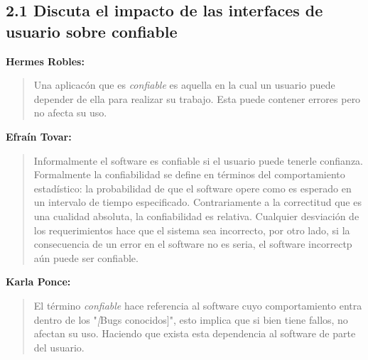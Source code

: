 \subsection*{2.1 Discuta el impacto de las interfaces de usuario sobre confiable}
\textbf{Hermes Robles:}

\begin{quote}
 Una aplicac\'on que es \textit{confiable} es aquella
en la cual un usuario puede depender de ella para
realizar su trabajo. Esta puede contener errores pero no afecta su uso.
\end{quote}

\textbf{Efra\'in Tovar:}

\begin{quote}
 Informalmente el software es confiable si el usuario puede tenerle confianza.
Formalmente la confiabilidad se define en t\'erminos del comportamiento estad\'istico:
la probabilidad de que el software opere como es esperado en un intervalo
de tiempo especificado. Contrariamente a la correctitud que es una cualidad
absoluta, la confiabilidad es relativa. Cualquier desviaci\'on de los requerimientos
hace que el sistema sea incorrecto, por otro lado, si la consecuencia de un error
en el software no es seria, el software incorrectp a\'un puede ser confiable.
\end{quote}

\textbf{Karla Ponce:}

\begin{quote}
 El t\'ermino \textit{confiable} hace referencia al software cuyo
comportamiento entra dentro de los "\textit[Bugs conocidos]",
esto implica que si bien tiene fallos, no afectan su uso.
Haciendo que exista esta dependencia al software de parte del usuario.
\end{quote}

